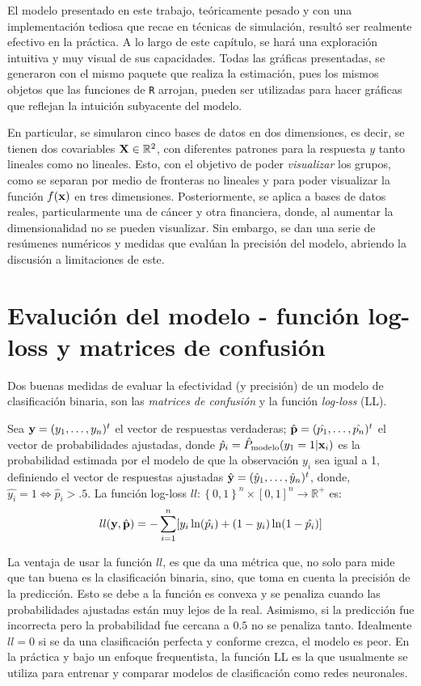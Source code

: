 \documentclass[../Main/Main.tex]{subfiles}
\begin{document}
El modelo presentado en este trabajo, teóricamente pesado y con una implementación tediosa que recae en técnicas de simulación, resultó ser realmente efectivo en la práctica. A lo largo de este capítulo, se hará una exploración intuitiva y muy visual de sus capacidades. Todas las gráficas presentadas, se generaron con el mismo paquete que realiza la estimación, pues los mismos objetos que las funciones de \verb|R| arrojan, pueden ser utilizadas para hacer gráficas que reflejan la intuición subyacente del modelo. 

En particular, se simularon cinco bases de datos en dos dimensiones, es decir, se tienen dos covariables $\mathbf{X}\in\mathbb{R}^2$,  con diferentes patrones para la respuesta $y$ tanto lineales como no lineales. Esto, con el objetivo de poder \textit{visualizar} los grupos, como se separan por medio de fronteras no lineales y para poder visualizar la función $f(\mathbf{x})$ en tres dimensiones. Posteriormente, se aplica a bases de datos reales, particularmente una de cáncer y otra financiera, donde, al aumentar la dimensionalidad no se pueden visualizar. Sin embargo, se dan una serie de resúmenes numéricos y medidas que evalúan la precisión del modelo, abriendo la discusión a limitaciones de este. 

\section{Evalución del modelo - función log-loss y matrices de confusión}
Dos buenas medidas de evaluar la efectividad (y precisión) de un modelo de clasificación binaria, son las \textit{matrices de confusión} y la función \textit{log-loss} (LL).

Sea $\mathbf{y} = (y_1,\ldots,y_n)^t$ el vector de respuestas verdaderas; $\hat{\mathbf{p}} = (\hat{p_1},\ldots,\hat{p_n})^t$ el vector de probabilidades ajustadas, donde $\hat{p}_i = \hat{P}_{\text{modelo}}(y_1 = 1|\mathbf{x}_i)$ es la probabilidad estimada por el modelo de que la observación $y_i$ sea igual a 1, definiendo el vector de respuestas ajustadas $\hat{\mathbf{y}} = (\hat{y}_1,\ldots,\hat{y}_n)^t$, donde, $\hat{y_i} = 1 \iff \hat{p}_i > .5$. La función log-loss $ll:\left\{0,1\right\}^n\times[0,1]^n\rightarrow \mathbb{R}^+$ es:
\begin{align}
	ll(\mathbf{y},\hat{\mathbf{p}}) = -\sum_{i = 1}^n[ y_i \ln(\hat{p_i}) + (1-y_i)\ln(1-\hat{p_i})] \label{ec:LogLoss}
\end{align}

La ventaja de usar la función $ll$, es que da una métrica que, no solo para mide que tan buena es la clasificación binaria, sino, que toma en cuenta la precisión de la predicción. Esto se debe a la función es convexa y se penaliza cuando las probabilidades ajustadas están muy lejos de la real. Asimismo, si la predicción fue incorrecta pero la probabilidad fue cercana a $0.5$ no se penaliza tanto. Idealmente $ll = 0$ si se da una clasificación perfecta y conforme crezca, el modelo es peor. En la práctica y bajo un enfoque frequentista, la función LL es la que usualmente se utiliza para entrenar y comparar modelos de clasificación como redes neuronales.
\end{document}
